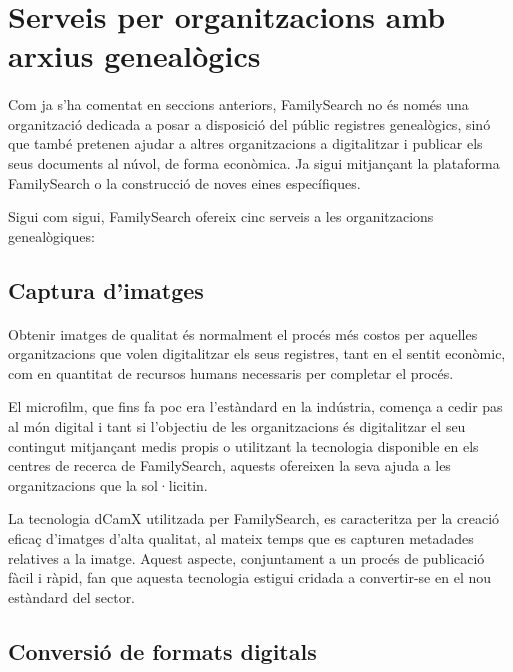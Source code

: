 \section{Serveis per organitzacions amb arxius genealògics}

    \paragraph{}
    Com ja s’ha comentat en seccions anteriors, FamilySearch no és només una or\-ga\-nit\-za\-ció dedicada a posar a disposició del públic registres genealògics, sinó que també pretenen ajudar a altres organitzacions a digitalitzar i publicar els seus documents al núvol, de forma econòmica. Ja sigui mitjançant la plataforma FamilySearch o la construcció de noves eines específiques.

    Sigui com sigui, FamilySearch ofereix cinc serveis a les organitzacions genea\-lò\-gi\-ques:

    \subsection{Captura d'imatges}

    \paragraph{}
    Obtenir imatges de qualitat és normalment el procés més costos per aquelles organitzacions que volen digitalitzar els seus registres, tant en el sentit econòmic, com en quantitat de recursos humans necessaris per completar el procés.

    El microfilm, que fins fa poc era l’estàndard en la indústria, comença a cedir pas al món digital i tant si l’objectiu de les organitzacions és digitalitzar el seu contingut mitjançant medis propis o utilitzant la tecnologia disponible en els centres de recerca de FamilySearch, aquests ofereixen la seva ajuda a les organitzacions que la sol·licitin.

    La tecnologia dCamX utilitzada per FamilySearch, es caracteritza per la creació eficaç d'imatges d'alta qualitat, al mateix temps que es capturen metadades relatives a la imatge. Aquest aspecte, conjuntament a un procés de publicació fàcil i ràpid, fan que aquesta tecnologia estigui cridada a convertir-se en el nou estàndard del sector.


    \subsection{Conversió de formats digitals}

